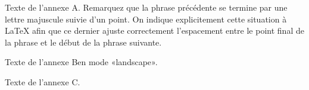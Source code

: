 Texte de l'annexe A\@. Remarquez que la phrase précédente se termine
par une lettre majuscule suivie d'un point. On indique explicitement
cette situation à \LaTeX{} afin que ce dernier ajuste correctement
l'espacement entre le point final de la phrase et le début de la
phrase suivante.


\begin{landscape}
Texte de l'annexe B\@ en mode «landscape».
\end{landscape}

Texte de l'annexe C\@.
